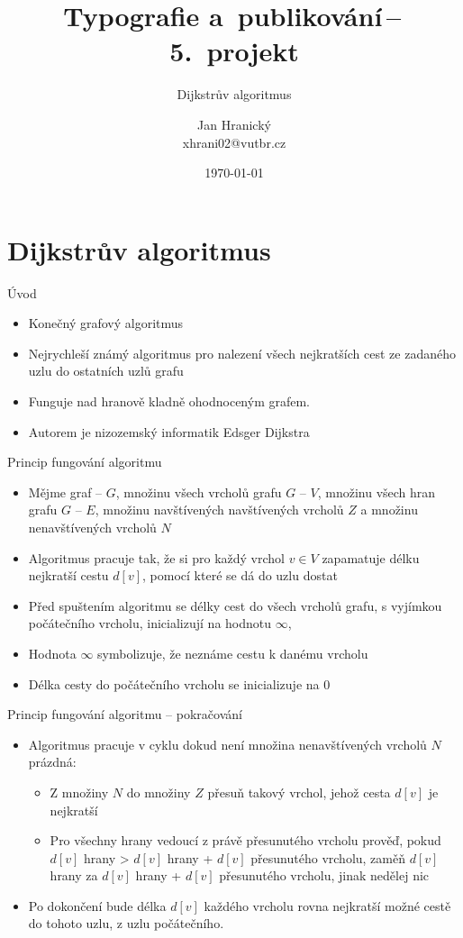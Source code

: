 \documentclass[10pt, hyperref={unicode}]{beamer}
\title{Typografie a~publikování\,--\,5.~projekt}
\subtitle{Dijkstrův algoritmus}
\author{Jan Hranický\texorpdfstring{\\ xhrani02@vutbr.cz}{}}
\date{\today}
\institute
{
	Vysoké učení technické v~Brně\\
	Fakulta informačních technologií
}
\begin{document}
  \maketitle
  \section{Dijkstrův algoritmus}
  \begin{frame}{Úvod}
  \bigskip
    \begin{itemize}
      \item Konečný grafový algoritmus
      \item Nejrychleší známý algoritmus pro nalezení všech nejkratších cest ze zadaného uzlu do ostatních uzlů grafu
      \item Funguje nad hranově kladně ohodnoceným grafem.
      \item Autorem je nizozemský informatik Edsger Dijkstra
    \end{itemize}
  \end{frame}

  \begin{frame}{Princip fungování algoritmu}
  \bigskip
    \begin{itemize}
      \item Mějme graf -- $G$, množinu všech vrcholů grafu $G$ -- $V$, množinu všech hran grafu $G$ -- $E$, množinu navštívených navštívených vrcholů $Z$ a množinu nenavštívených vrcholů $N$
      \item Algoritmus pracuje tak, že si pro každý vrchol $v \in V$ zapamatuje délku nejkratší cestu $d[v]$, pomocí které se dá do uzlu dostat
      \item Před spuštením algoritmu se délky cest do všech vrcholů grafu, s vyjímkou počátečního vrcholu, inicializují na hodnotu $\infty$, \item Hodnota $\infty$ symbolizuje, že neznáme cestu k danému vrcholu
      \item Délka cesty do počátečního vrcholu se inicializuje na $0$
    \end{itemize}
  \end{frame}

	\begin{frame}{Princip fungování algoritmu -- pokračování}
	\bigskip
		\begin{itemize}
			\item Algoritmus pracuje v cyklu dokud není množina nenavštívených vrcholů $N$ prázdná:
			\begin{itemize}
				\item Z množiny $N$ do množiny $Z$ přesuň takový vrchol, jehož cesta $d[v]$ je nejkratší
				\item Pro všechny hrany vedoucí z právě přesunutého vrcholu prověď, pokud $d[v]$ hrany > $d[v]$ hrany + $d[v]$ přesunutého vrcholu, zaměň $d[v]$ hrany za $d[v]$ hrany + $d[v]$ přesunutého vrcholu, jinak nedělej nic
			\end{itemize}
			\item Po dokončení bude délka $d[v]$ každého vrcholu rovna nejkratší možné cestě do tohoto uzlu, z uzlu počátečního.
		\end{itemize}
	\end{frame}
\end{document}
